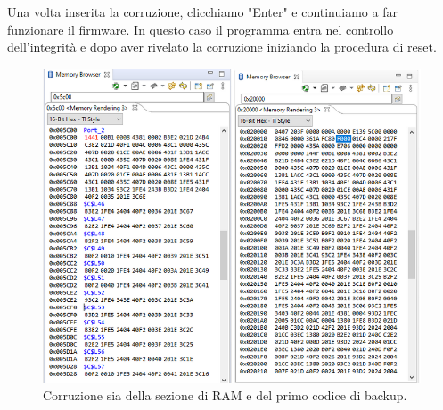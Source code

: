 \documentclass[LaM,binding=0.6cm,oneside]{../sapthesis}
\begin{document}
Una volta inserita la corruzione, clicchiamo "Enter" e continuiamo a far funzionare il firmware.
In questo caso il programma entra nel controllo dell'integrità e dopo aver rivelato la corruzione iniziando la procedura di reset.

\begin{figure}[htbp]
\centerline{\includegraphics[scale=0.55]{examples/BootloaderTestCorruzioni2.PNG}}
\caption{Corruzione sia della sezione di RAM e del primo codice di backup.}
\label{fig}
\end{figure}
\newline
\end{document}
